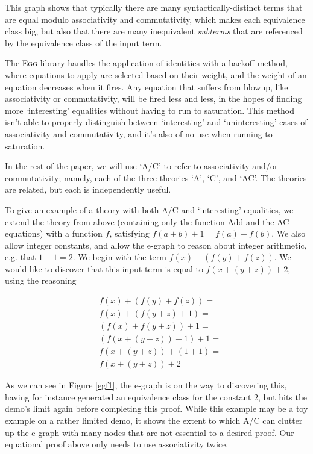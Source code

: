 \documentclass{article}
\begin{document}
This graph shows that typically there are many syntactically-distinct terms that are equal modulo associativity and commutativity, which makes each equivalence class big, but also that there are many inequivalent \textit{subterms} that are referenced by the equivalence class of the input term.

The \textsc{Egg} library handles the application of identities with a backoff method, where
equations to apply are selected based on their weight, and the weight of an equation decreases when it fires. Any equation that suffers from blowup, like associativity or commutativity, will be fired less and less, in the hopes of finding more `interesting' equalities without having to run to saturation. This method isn't able to properly distinguish between `interesting' and `uninteresting' cases of associativity and commutativity, and it's also of no use when running to saturation.

In the rest of the paper, we will use `A/C' to refer to associativity and/or commutativity; namely, each of the three theories `A', `C', and `AC'. The theories are related, but each is independently useful.

To give an example of a theory with both A/C and `interesting' equalities, we extend the theory from above (containing only the function Add and the AC equations) with a function $f$, satisfying $f(a + b) + 1 = f(a) + f(b)$. We also allow integer constants, and allow the e-graph to reason about integer arithmetic, e.g. that $1+1=2$. We begin with the term $f(x) + (f(y) + f(z))$. We would like to discover that this input term is equal to $f(x + (y + z)) + 2$, using the reasoning

\begin{align*}
	&f(x) + (f(y) + f(z)) = \\
	&f(x) + (f(y + z) + 1) = \\
	&(f(x) + f(y + z)) + 1 = \\
	&(f(x + (y + z)) + 1) + 1 = \\
	&f(x + (y + z)) + (1 + 1) = \\
	&f(x + (y + z)) + 2
\end{align*}

As we can see in Figure \ref{egf1}, the e-graph is on the way to discovering this, having for instance generated an equivalence class for the constant $2$, but hits the demo's limit again before completing this proof. While this example may be a toy example on a rather limited demo, it shows the extent to which A/C can clutter up the e-graph with many nodes that are not essential to a desired proof. Our equational proof above only needs to use associativity twice.
\end{document}
